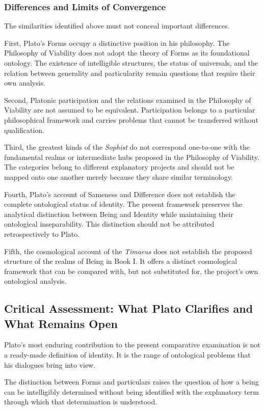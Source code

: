 \subsubsection{Differences and Limits of Convergence}

The similarities identified above must not conceal important
differences.

First, Plato's Forms occupy a distinctive position in his
philosophy. The Philosophy of Viability does not adopt the theory
of Forms as its foundational ontology. The existence of
intelligible structures, the status of universals, and the
relation between generality and particularity remain questions
that require their own analysis.

Second, Platonic participation and the relations examined in
the Philosophy of Viability are not assumed to be equivalent.
Participation belongs to a particular philosophical framework
and carries problems that cannot be transferred without
qualification.

Third, the greatest kinds of the \textit{Sophist} do not correspond
one-to-one with the fundamental realms or intermediate hubs
proposed in the Philosophy of Viability. The categories belong
to different explanatory projects and should not be mapped
onto one another merely because they share similar terminology.

Fourth, Plato's account of Sameness and Difference does not
establish the complete ontological status of identity. The
present framework preserves the analytical distinction between
Being and Identity while maintaining their ontological
inseparability. This distinction should not be attributed
retrospectively to Plato.

Fifth, the cosmological account of the \textit{Timaeus} does not
establish the proposed structure of the realms of Being in
Book I. It offers a distinct cosmological framework that can
be compared with, but not substituted for, the project's
own ontological analysis.

\subsection{Critical Assessment: What Plato Clarifies and What Remains Open}

Plato's most enduring contribution to the present comparative
examination is not a ready-made definition of identity. It is
the range of ontological problems that his dialogues bring into
view.

The distinction between Forms and particulars raises the question
of how a being can be intelligibly determined without being
identified with the explanatory term through which that
determination is understood.

